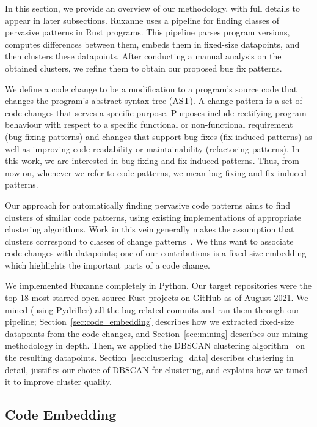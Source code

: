In this section, we provide an overview of our methodology, with full details to appear in later subsections. Ruxanne uses a pipeline for finding classes of pervasive patterns in Rust programs. This pipeline parses program versions, computes differences between them, embeds them in fixed-size datapoints, and then clusters these datapoints. After conducting a manual analysis on the obtained clusters, we refine them to obtain our proposed bug fix patterns.

We define a code change to be a modification to a program's source code that changes the program's abstract syntax tree (AST). A change pattern is a set of code changes that serves a specific purpose. Purposes include rectifying program behaviour with respect to a specific functional or non-functional requirement (bug-fixing patterns) and changes that support bug-fixes (fix-induced patterns) as well as improving code readability or maintainability (refactoring patterns). In this work, we are interested in bug-fixing and fix-induced patterns. Thus, from now on, whenever we refer to code patterns, we mean bug-fixing and fix-induced patterns.

Our approach for automatically finding pervasive code patterns aims to find clusters of similar code patterns, using existing implementations of appropriate clustering algorithms. Work in this vein generally makes the assumption that clusters correspond to classes of change patterns~\citep{hanam2016discovering,campos2019discovering,yang2022mining}. We thus want to associate code changes with datapoints; one of our contributions is a fixed-size embedding which highlights the important parts of a code change.


We implemented Ruxanne completely in Python. Our target repositories were the top 18 most-starred open source Rust projects on GitHub as of August 2021. We mined (using Pydriller) all the bug related commits and ran them through our pipeline; Section~\ref{sec:code_embedding} describes how we extracted fixed-size datapoints from the code changes, and Section~\ref{sec:mining} describes our mining methodology in depth. Then, we applied the DBSCAN clustering algorithm~\citep{ester1996density} on the resulting datapoints. Section~\ref{sec:clustering_data} describes clustering in detail, justifies our choice of DBSCAN for clustering, and explains how we tuned it to improve cluster quality. 

\subsection{\label{sec:code_embedding}Code Embedding}


